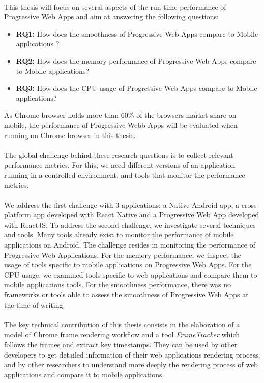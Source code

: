 \documentclass{kththesis}
\begin{document}
\paragraph{}
This thesis will focus on several aspects of the run-time performance of Progressive Web Apps and aim at answering the following questions: 

\begin{itemize}
    \item \textbf{RQ1:} How does the smoothness of Progressive Web Apps compare to Mobile applications ? 
    
    \item \textbf{RQ2:} How does the memory performance of Progressive Web Apps compare to Mobile applications? 
    \item \textbf{RQ3:} How does the CPU usage of Progressive Web Apps compare to Mobile applications?
\end{itemize}

As Chrome browser holds more than 60\% of the browsers market share on mobile, the performance of Progressive Webb Apps will be evaluated when running on Chrome browser in this thesis.

\paragraph{}
The global challenge behind these research questions is to collect relevant performance metrics. For this, we need different versions of an application running in a controlled environment, and tools that monitor the performance metrics.
\paragraph{}
We address the first challenge with 3 applications: a Native Android app, a cross-platform app developed with React Native and a Progressive Web App developed with ReactJS. 
To address the second challenge, we investigate several techniques and tools. Many tools already exist to monitor the performance of mobile applications on Android. The challenge resides in monitoring the performance of Progressive Web Applications. For the memory performance, we inspect the usage of tools specific to mobile applications on Progressive Web Apps. For the CPU usage, we examined tools specific to web applications and compare them to mobile applications tools. For the smoothness performance, there was no frameworks or tools able to assess the smoothness of Progressive Web Apps at the time of writing.
\paragraph{}
The key technical contribution of this thesis consists in the elaboration of a model of Chrome frame rendering workflow and a tool \textit{FrameTracker} which follows the frames and extract key timestamps. They can be used by other developers to get detailed information of their web applications rendering process, and by other researchers 
to understand more deeply the rendering process of web applications and compare it to mobile applications. 
\end{document}
